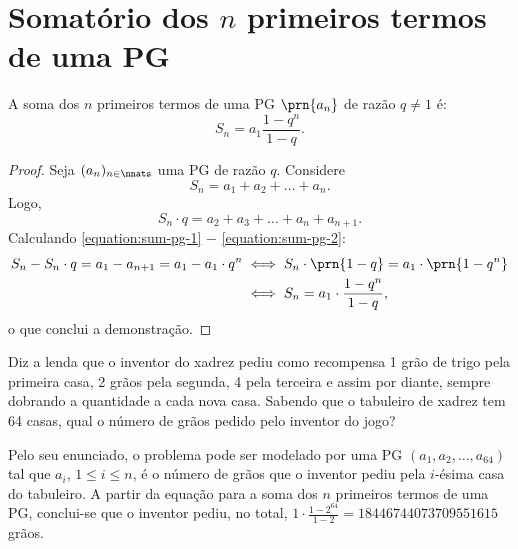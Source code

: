 \section{Somatório dos $n$ primeiros termos de uma PG}

\begin{proposition}
A soma dos $n$ primeiros termos de uma PG $\prn {a_n}$ de razão $q \ne 1$ é:
\begin{equation*}
S_n = a_1 \frac{1-q^n}{1-q}.
\end{equation*}
\end{proposition}

\begin{proof}
Seja $(a_n)_{n \in \nnats}$ uma PG de razão $q$. Considere
%
\begin{equation}
\label{equation:sum-pg-1}
S_n = a_1 + a_2 + \dots + a_n.
\end{equation}
%
Logo, 
%
\begin{equation}
\label{equation:sum-pg-2}
S_n \cdot q = a_2 + a_3 + \dots + a_n + a_{n+1}.
\end{equation}
%
Calculando \ref{equation:sum-pg-1} $-$ \ref{equation:sum-pg-2}:
%
\begin{align*}
S_n - S_n \cdot q = a_1 - a_{n+1} = a_1 - a_1 \cdot q^n & \iff S_n\cdot\prn{1-q} = a_1\cdot\prn{1-q^n} \\ &\iff S_n = a_1 \cdot \frac{1-q^n}{1-q},
\end{align*}
%
\noindent o que conclui a demonstração.

\end{proof}

\begin{example}
Diz a lenda que o inventor do xadrez pediu como recompensa 1 grão de trigo pela primeira casa, 2 grãos pela segunda, 4 pela terceira e assim por diante, sempre dobrando a quantidade a cada nova casa. Sabendo que o tabuleiro de xadrez tem 64 casas, qual o número de grãos pedido pelo inventor do jogo?
\end{example}

\begin{solution}
Pelo seu enunciado, o problema pode ser modelado por uma PG $(a_1, a_2, \dots, a_{64})$ tal que $a_i$, $1 \le i \le n$, é o número de grãos que o inventor pediu pela $i$-ésima casa do tabuleiro. A partir da equação para a soma dos $n$ primeiros termos de uma PG, conclui-se que o inventor pediu, no total, $1 \cdot \frac {1 - 2^{64}} {1-2} = 18446744073709551615$ grãos.
\end{solution}